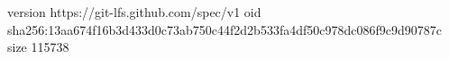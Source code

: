 version https://git-lfs.github.com/spec/v1
oid sha256:13aa674f16b3d433d0c73ab750c44f2d2b533fa4df50c978dc086f9c9d90787c
size 115738
